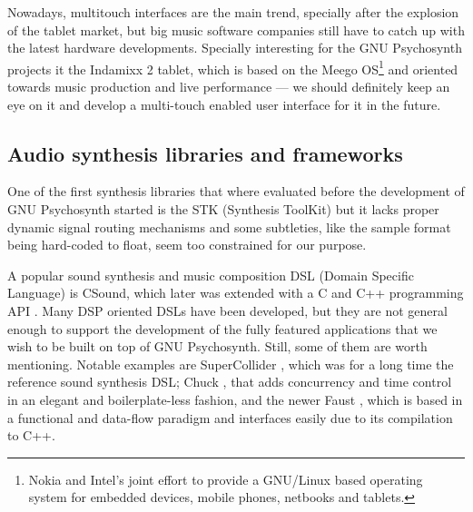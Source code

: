 Nowadays, multitouch interfaces are the main trend, specially after
the explosion of the tablet market, but big music software companies
still have to catch up with the latest hardware
developments. Specially interesting for the GNU Psychosynth projects
it the Indamixx 2 tablet, which is based on the
Meego OS\footnote{Nokia and Intel's joint effort to
  provide a GNU/Linux based operating system for embedded devices,
  mobile phones, netbooks and tablets.} and oriented towards music
production and live performance --- we should definitely keep an eye
on it and develop a multi-touch enabled user interface for it in the
future.

\subsection{Audio synthesis libraries and frameworks}
\label{sec:dsl}

One of the first synthesis libraries that where evaluated before the
development of GNU Psychosynth started is the STK (Synthesis
ToolKit) \cite{scavone05rtmidi} but it
lacks proper dynamic signal routing mechanisms and some subtleties,
like the sample format being hard-coded to float, seem too
constrained for our purpose.

A popular sound synthesis and music composition DSL (Domain Specific
Language) is
CSound, which later was extended with a C and C++
programming API \cite{boulanger00csound, boulanger10audio}. Many DSP
oriented DSLs have been developed, but they are not general enough to
support the development of the fully featured applications that we
wish to be built on top of GNU Psychosynth. Still, some of them are
worth mentioning. Notable examples are
SuperCollider
\cite{mccartney2002supercollider}, which was for a long time the
reference sound synthesis DSL; Chuck
\cite{wang03chuck}, that adds concurrency and time control in an
elegant and boilerplate-less fashion, and the newer Faust \cite{orlarey09faust}, which is based in a functional and
data-flow paradigm and interfaces easily due to its compilation to
C++.

